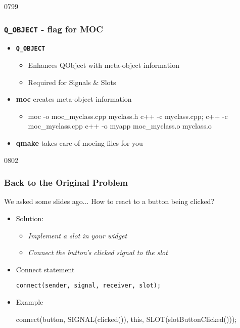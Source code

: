 \begin{slide}[fragile]{0799}\frametitle{\texttt{Q\_OBJECT} - flag for MOC}
\begin{itemize}
\item \textbf{\texttt{Q\_OBJECT}}
  \begin{itemize}
  \item Enhances QObject with meta-object information
  \item Required for Signals \& Slots
  \end{itemize}\medskip

  \item \textbf{moc} creates meta-object information
    \begin{itemize}
    \item[] \begin{shell}
moc -o moc_myclass.cpp myclass.h
c++ -c myclass.cpp; c++ -c moc_myclass.cpp
c++ -o myapp moc_myclass.o myclass.o
    \end{shell}
 \end{itemize}\medskip

 \item \textbf{qmake} takes care of mocing files for you
\end{itemize}

\end{slide}

\begin{slide}[fragile]{0802}\frametitle{Back to the Original Problem}
  \begin{block}{We asked some slides ago...}
    How to react to a button being clicked?
  \end{block}
\begin{itemize}
\item Solution:
  \begin{itemize}
  \item \emph{Implement a slot in your widget}
  \item \emph{Connect the button's clicked signal to the slot}
  \end{itemize}\medskip

\item Connect statement
\begin{lstlisting}
connect(sender, signal, receiver, slot);
\end{lstlisting}\medskip

\item Example
\begin{cpp}
connect(button, SIGNAL(clicked()),
        this,   SLOT(slotButtonClicked()));
\end{cpp}
\end{itemize}
\end{slide}



